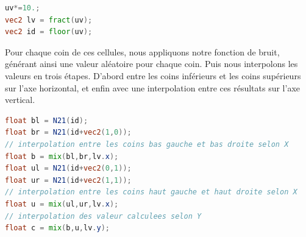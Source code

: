 \begin{minipage}{\linewidth}
\begin{lstlisting}[language=GLSL, caption=Les fonctions \lstinline{fract()} et \lstinline{floor()},captionpos=b,frame=single]
uv*=10.;
vec2 lv = fract(uv);
vec2 id = floor(uv);
\end{lstlisting}
\end{minipage}

Pour chaque coin de ces cellules, nous appliquons notre fonction de bruit, générant ainsi une valeur aléatoire pour chaque coin. Puis nous interpolons les valeurs en trois étapes. D'abord entre les coins inférieurs et les coins supérieurs sur l'axe horizontal, et enfin avec une interpolation entre ces résultats sur l'axe vertical.

\begin{minipage}{\linewidth}
\begin{lstlisting}[language=GLSL, caption=Interpolation pour chaque cellule,captionpos=b,frame=single]
float bl = N21(id);
float br = N21(id+vec2(1,0));
// interpolation entre les coins bas gauche et bas droite selon X
float b = mix(bl,br,lv.x);
float ul = N21(id+vec2(0,1));
float ur = N21(id+vec2(1,1));
// interpolation entre les coins haut gauche et haut droite selon X
float u = mix(ul,ur,lv.x);
// interpolation des valeur calculees selon Y
float c = mix(b,u,lv.y);
\end{lstlisting}
\end{minipage}

